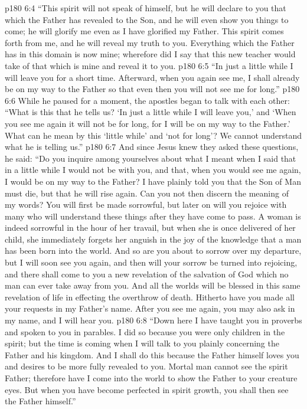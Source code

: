 \vs p180 6:4 \textcolor{ubdarkred}{“This spirit will not speak of himself, but he will declare to you that which the Father has revealed to the Son, and he will even show you things to come; he will glorify me even as I have glorified my Father. This spirit comes forth from me, and he will reveal my truth to you. Everything which the Father has in this domain is now mine; wherefore did I say that this new teacher would take of that which is mine and reveal it to you.}
\vs p180 6:5 \textcolor{ubdarkred}{“In just a little while I will leave you for a short time. Afterward, when you again see me, I shall already be on my way to the Father so that even then you will not see me for long.”}
\vs p180 6:6 While he paused for a moment, the apostles began to talk with each other: “What is this that he tells us? ‘In just a little while I will leave you,’ and ‘When you see me again it will not be for long, for I will be on my way to the Father.’ What can he mean by this ‘little while’ and ‘not for long’? We cannot understand what he is telling us.”
\vs p180 6:7 And since Jesus knew they asked these questions, he said: \textcolor{ubdarkred}{“Do you inquire among yourselves about what I meant when I said that in a little while I would not be with you, and that, when you would see me again, I would be on my way to the Father? I have plainly told you that the Son of Man must die, but that he will rise again. Can you not then discern the meaning of my words? You will first be made sorrowful, but later on will you rejoice with many who will understand these things after they have come to pass. A woman is indeed sorrowful in the hour of her travail, but when she is once delivered of her child, she immediately forgets her anguish in the joy of the knowledge that a man has been born into the world. And so are you about to sorrow over my departure, but I will soon see you again, and then will your sorrow be turned into rejoicing, and there shall come to you a new revelation of the salvation of God which no man can ever take away from you. And all the worlds will be blessed in this same revelation of life in effecting the overthrow of death. Hitherto have you made all your requests in my Father’s name. After you see me again, you may also ask in my name, and I will hear you.}
\vs p180 6:8 \textcolor{ubdarkred}{“Down here I have taught you in proverbs and spoken to you in parables. I did so because you were only children in the spirit; but the time is coming when I will talk to you plainly concerning the Father and his kingdom. And I shall do this because the Father himself loves you and desires to be more fully revealed to you. Mortal man cannot see the spirit Father; therefore have I come into the world to show the Father to your creature eyes. But when you have become perfected in spirit growth, you shall then see the Father himself.”}
